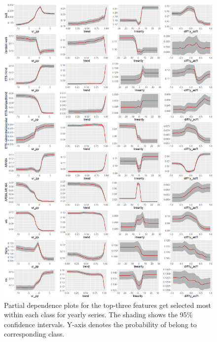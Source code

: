 \documentclass[11pt,a4paper,]{article}
\begin{document}
\begin{figure}
\centering
\includegraphics{figures/pdpyearly-1.png}
\caption{\label{fig:pdpyearly}Partial dependence plots for the top-three
features get selected most within each class for yearly series. The
shading shows the 95\% confidence intervals. Y-axis denotes the
probability of belong to corresponding class.}
\end{figure}

\newpage
\end{document}
